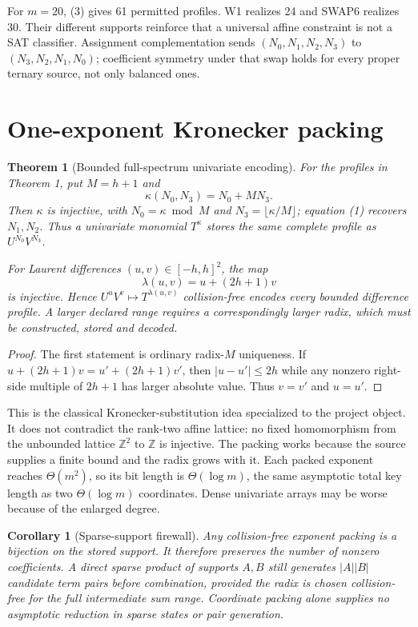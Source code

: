 \documentclass[10pt]{article}
\newtheorem{theorem}{Theorem}
\newtheorem{corollary}{Corollary}
\begin{document}
For $m=20$, (3) gives 61 permitted profiles.  W1 realizes 24 and SWAP6
realizes 30.  Their different supports reinforce that a universal affine
constraint is not a SAT classifier.  Assignment complementation sends
$(N_0,N_1,N_2,N_3)$ to $(N_3,N_2,N_1,N_0)$; coefficient symmetry under that
swap holds for every proper ternary source, not only balanced ones.

\section{One-exponent Kronecker packing}
\begin{theorem}[Bounded full-spectrum univariate encoding]
For the profiles in Theorem 1, put $M=h+1$ and
\[
\kappa(N_0,N_3)=N_0+MN_3.
\]
Then $\kappa$ is injective, with
$N_0=\kappa\bmod M$ and $N_3=\lfloor\kappa/M\rfloor$; equation (1) recovers
$N_1,N_2$.  Thus a univariate monomial $T^{\kappa}$ stores the same complete
profile as $U^{N_0}V^{N_3}$.

For Laurent \emph{differences} $(u,v)\in[-h,h]^2$, the map
\[
\lambda(u,v)=u+(2h+1)v
\]
is injective.  Hence $U^uV^v\mapsto T^{\lambda(u,v)}$ collision-free encodes
every bounded difference profile.  A larger declared range requires a
correspondingly larger radix, which must be constructed, stored and decoded.
\end{theorem}
\begin{proof}
The first statement is ordinary radix-$M$ uniqueness.  If
$u+(2h+1)v=u'+(2h+1)v'$, then
$|u-u'|\le2h$ while any nonzero right-side multiple of $2h+1$ has larger
absolute value.  Thus $v=v'$ and $u=u'$.
\end{proof}

This is the classical Kronecker-substitution idea specialized to the project
object.  It does not contradict the rank-two affine lattice: no fixed
homomorphism from the unbounded lattice $\mathbb Z^2$ to $\mathbb Z$ is
injective.  The packing works because the source supplies a finite bound and
the radix grows with it.  Each packed exponent reaches $\Theta(m^2)$, so its
bit length is $\Theta(\log m)$, the same asymptotic total key length as two
$\Theta(\log m)$ coordinates.  Dense univariate arrays may be worse because
of the enlarged degree.

\begin{corollary}[Sparse-support firewall]
Any collision-free exponent packing is a bijection on the stored support.
It therefore preserves the number of nonzero coefficients.  A direct sparse
product of supports $A,B$ still generates $|A||B|$ candidate term pairs
before combination, provided the radix is chosen collision-free for the full
intermediate sum range.  Coordinate packing alone supplies no asymptotic
reduction in sparse states or pair generation.
\end{corollary}
\end{document}
